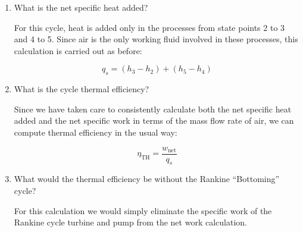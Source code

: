 \begin{enumerate}
\item What is the net specific heat added?

For this cycle, heat is added only in the processes from state points 2 to 3 and 4 to 5.  Since air is the only working fluid involved in these processes, this calculation is carried out as before:

$$q_s = (h_3 - h_2) + (h_5 - h_4)$$

\item What is the cycle thermal efficiency?

Since we have taken care to consistently calculate both the net specific heat added and the net specific work in terms of the mass flow rate of air, we can compute thermal efficiency in the usual way:

$$\eta_{\text{TH}} = \frac{w_{\text{net}}}{q_s}$$

\item What would the thermal efficiency be without the Rankine ``Bottoming'' cycle?

For this calculation we would simply eliminate the specific work of the Rankine cycle turbine and pump from the net work calculation.

\end{enumerate}
